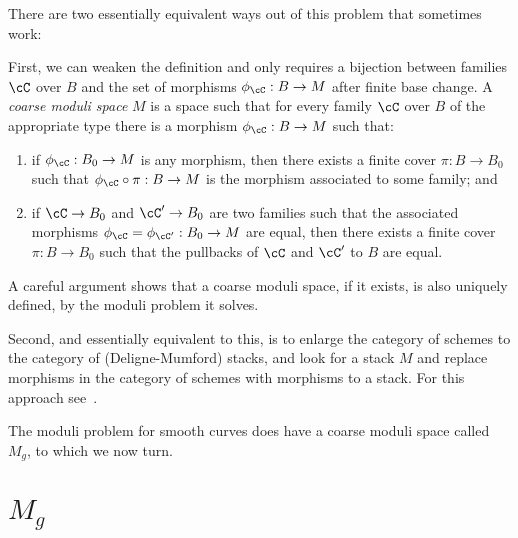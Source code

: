 There are two essentially equivalent ways out of this problem that sometimes work:

First, we can weaken the definition and only requires a bijection between families $\cC$ over $B$ and the set of morphisms $\phi_\cC : B \to M$ after finite base change. A \emph{coarse moduli space} $M$ is a space such that for every family  $\cC$ over $B$ 
of the appropriate type there is a morphism $\phi_\cC : B \to M$ such that:

\begin{enumerate}
\item if $\phi_\cC : B_0 \to M$ is any morphism, then there exists a finite cover $\pi : B \to B_0$ such that $\phi_\cC \circ \pi : B \to M$ is the morphism associated to some family; and
\item if $\cC \to B_0$ and $\cC' \to B_0$ are two families such that the associated morphisms $\phi_\cC = \phi_{\cC'} : B_0 \to M$ are equal, then there exists a finite cover $\pi : B \to B_0$ such that the pullbacks of $\cC$ and $\cC'$ to $B$ are equal.
\end{enumerate}

A careful argument shows that a coarse moduli space, if it exists, is also uniquely defined, by the moduli problem it solves.

Second, and essentially equivalent to this, is to enlarge the category of schemes to the category of (Deligne-Mumford) stacks, and look for
a stack $M$ and replace morphisms in the category of schemes with morphisms to a stack. For this approach see~\cite{Deligne-Mumford}. 

The moduli problem for smooth curves does have a coarse moduli space called $M_g$, to which we now turn.

\section{$M_g$}


